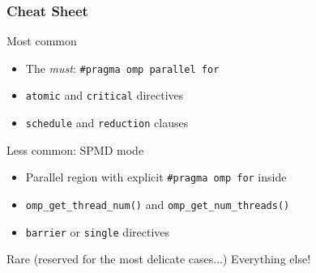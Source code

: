 \documentclass{beamer}
\begin{document}
\begin{frame}[fragile=singleslide]
  \frametitle{Cheat Sheet}

  \begin{exampleblock}{Most common}
    \begin{itemize}
    \item The \textit{must}: \verb|#pragma omp parallel for|
    \item \verb|atomic| and \verb|critical| directives
    \item \verb|schedule| and \verb|reduction| clauses
    \end{itemize}
  \end{exampleblock}

  \begin{block}{Less common: SPMD mode}
    \begin{itemize}
    \item Parallel region with explicit \verb|#pragma omp for| inside
    \item \verb|omp_get_thread_num()| and \verb|omp_get_num_threads()|
    \item \verb|barrier| or \verb|single| directives
    \end{itemize}
  \end{block}

  \begin{alertblock}{Rare (reserved for the most delicate cases...)}
    Everything else!
  \end{alertblock}
\end{frame}
\end{document}
